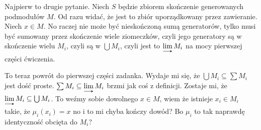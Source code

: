 \documentclass{article}
\begin{document}
Najpierw to drugie pytanie. Niech $S$ będzie zbiorem skończenie generowanych podmodułów $M$. Od razu widać, że jest to zbiór uporządkowany przez zawieranie. Niech $x\in M$. No raczej nie może być nieskończoną sumą generatorów, tylko musi być sumowany przez skończenie wiele ziomeczków, czyli jego generatory są w skończenie wielu $M_i$, czyli są w $\bigcup M_i$, czyli jest to $\dlim M_i$ na mocy pierwszej części ćwiczenia.

To teraz powrót do pierwszej części zadanka. Wydaje mi się, że $\bigcup M_i\subseteq\sum M_i$ jest dość proste. $\sum M_i\subseteq\dlim M_i$ brzmi jak coś z definicji. Zostaje mi, że $\dlim M_i\subseteq\bigcup M_i$. To weźmy sobie dowolnego $x\in M$, wiem że istnieje $x_i\in M_i$ takie, że $\mu_i(x_i)=x$ no i to mi chyba kończy dowód? Bo $\mu_i$ to tak naprawdę identyczność obcięta do $M_i$? 
\end{document}
